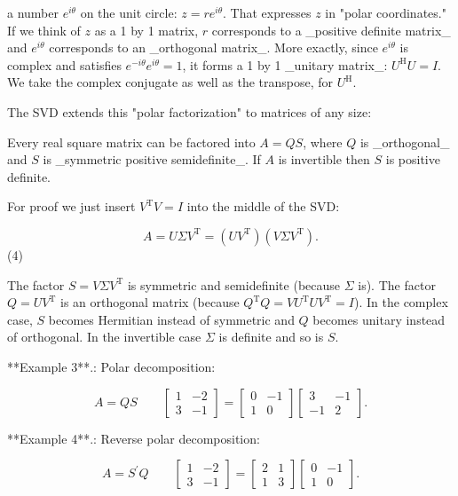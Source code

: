 a number \(e^{i\theta}\) on the unit circle: \(z=re^{i\theta}\). That expresses \(z\) in "polar coordinates." If we think of \(z\) as a 1 by 1 matrix, \(r\) corresponds to a _positive definite matrix_ and \(e^{i\theta}\) corresponds to an _orthogonal matrix_. More exactly, since \(e^{i\theta}\) is complex and satisfies \(e^{-i\theta}e^{i\theta}=1\), it forms a 1 by 1 _unitary matrix_: \(U^{\mathrm{H}}U=I\). We take the complex conjugate as well as the transpose, for \(U^{\mathrm{H}}\).

The SVD extends this "polar factorization" to matrices of any size:

Every real square matrix can be factored into \(A=QS\), where \(Q\) is _orthogonal_ and \(S\) is _symmetric positive semidefinite_. If \(A\) is invertible then \(S\) is positive definite.

For proof we just insert \(V^{\mathrm{T}}V=I\) into the middle of the SVD:

\[A=U\Sigma V^{\mathrm{T}}=(UV^{\mathrm{T}})(V\Sigma V^{\mathrm{T}}).\] (4)

The factor \(S=V\Sigma V^{\mathrm{T}}\) is symmetric and semidefinite (because \(\Sigma\) is). The factor \(Q=UV^{\mathrm{T}}\) is an orthogonal matrix (because \(Q^{\mathrm{T}}Q=VU^{\mathrm{T}}UV^{\mathrm{T}}=I\)). In the complex case, \(S\) becomes Hermitian instead of symmetric and \(Q\) becomes unitary instead of orthogonal. In the invertible case \(\Sigma\) is definite and so is \(S\).

**Example 3**.: Polar decomposition:

\[A=QS\qquad\begin{bmatrix}1&-2\\ 3&-1\end{bmatrix}=\begin{bmatrix}0&-1\\ 1&0\end{bmatrix}\begin{bmatrix}3&-1\\ -1&2\end{bmatrix}.\]

**Example 4**.: Reverse polar decomposition:

\[A=S^{\prime}Q\qquad\begin{bmatrix}1&-2\\ 3&-1\end{bmatrix}=\begin{bmatrix}2&1\\ 1&3\end{bmatrix}\begin{bmatrix}0&-1\\ 1&0\end{bmatrix}.\]

